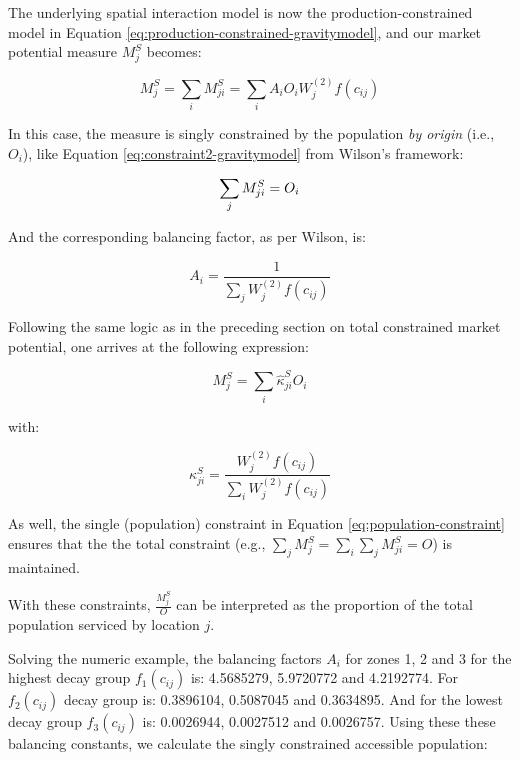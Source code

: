 \documentclass[
11pt, %
oneside, %
english, %
singlespacing, %
]{macthesis} %
\begin{document}
The underlying spatial interaction model is now the production-constrained model in Equation \ref{eq:production-constrained-gravitymodel}, and our market potential measure \(M^S_j\) becomes:

\begin{equation}
\label{eq:population-constrained-accessibility}
M^S_j =  \sum_i M^S_{ji} = \sum_i A_i O_i W_j^{(2)} f(c_{ij})
\end{equation} 

In this case, the measure is singly constrained by the population \emph{by origin} (i.e., \(O_i\)), like Equation \ref{eq:constraint2-gravitymodel} from Wilson's framework:

\begin{equation}
\label{eq:population-constraint}
\sum_j M^S_{ji} =  O_i \\
\end{equation} 

And the corresponding balancing factor, as per Wilson, is:

\begin{equation}
\label{eq:population-constrained-proportionality-constants}
A_i = \frac{1}{\sum_j W_j^{(2)} f(c_{ij})}
\end{equation} 

Following the same logic as in the preceding section on total constrained market potential, one arrives at the following expression:

\begin{equation}
\label{eq:production-constrained-accessibility-with-proportional-allocation-factor}
M^S_{j} = \sum_i \hat \kappa^S_{ji} O_i
\end{equation} 

\noindent with:

\begin{equation}
\label{eq:attraction-constrained-proportional-allocation-factor}
\kappa^S_{ji} = \frac{W_j^{(2)} f(c_{ij})}{\sum_i W_j^{(2)} f(c_{ij})}
\end{equation} 

As well, the single (population) constraint in Equation \ref{eq:population-constraint} ensures that the the total constraint (e.g., \(\sum_j M^S_{j} = \sum_i\sum_j  M^S_{ji} = O\)) is maintained.

With these constraints, \(\frac{M_j^S}{O}\) can be interpreted as the proportion of the total population serviced by location \(j\).

Solving the numeric example, the balancing factors \(A_i\) for zones 1, 2 and 3 for the highest decay group \(f_1(c_{ij})\) is: 4.5685279, 5.9720772 and 4.2192774. For \(f_2(c_{ij})\) decay group is: 0.3896104, 0.5087045 and 0.3634895. And for the lowest decay group \(f_3(c_{ij})\) is: 0.0026944, 0.0027512 and 0.0026757. Using these these balancing constants, we calculate the singly constrained accessible population:
\end{document}
